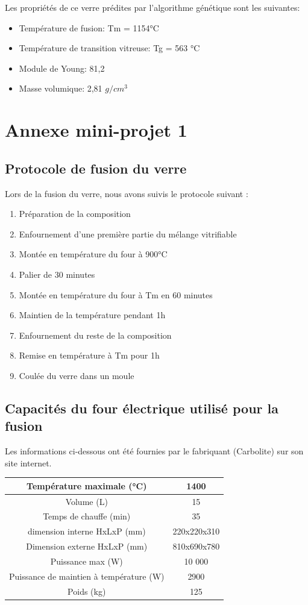 \documentclass{article}
\begin{document}
Les propriétés de ce verre prédites par l'algorithme génétique sont les suivantes:
\begin{itemize}
    \item Température de fusion: Tm = 1154°C
    \item Température de transition vitreuse: Tg = 563 °C 
    \item Module de Young: 81,2
    \item Masse volumique: 2,81 $g/cm^{3}$
\end{itemize}

\section{Annexe mini-projet 1}
\subsection{Protocole de fusion du verre}

Lors de la fusion du verre, nous avons suivis le protocole suivant :

\begin{enumerate}
    \item Préparation de la composition
    \item Enfournement d'une première partie du mélange vitrifiable
    \item Montée en température du four à 900°C
    \item Palier de 30 minutes
    \item Montée en température du four à Tm en 60 minutes
    \item Maintien de la température pendant 1h
    \item Enfournement du reste de la composition
    \item Remise en température à Tm pour 1h
    \item Coulée du verre dans un moule
\end{enumerate}

\subsection{Capacités du four électrique utilisé pour la fusion}

Les informations ci-dessous ont été fournies par le fabriquant (Carbolite) sur son site internet.

\begin{tabular}{|c|c|}
\hline
Température maximale (°C) & 1400  \\
\hline
Volume (L) & 15 \\
\hline
Temps de chauffe (min) & 35 \\
\hline
dimension interne HxLxP (mm) & 220x220x310 \\
\hline
Dimension externe HxLxP (mm) & 810x690x780 \\
\hline
Puissance max (W) & 10 000 \\
\hline
Puissance de maintien à température (W) & 2900 \\
\hline
Poids (kg) & 125 \\
\hline
\end{tabular} 
\end{document}
